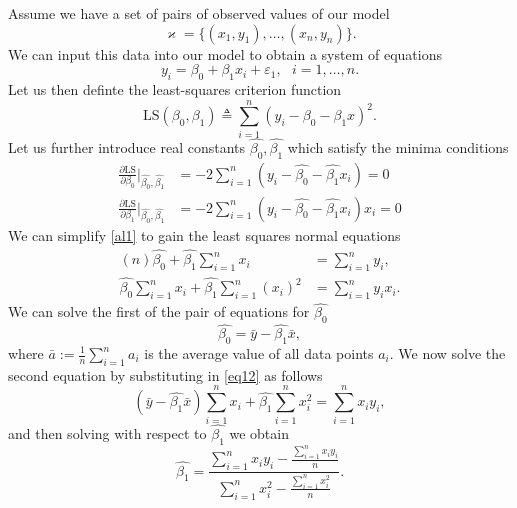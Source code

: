 \documentclass[10pt,a4paper]{article}
\numberwithin{equation}{section}
\theoremstyle{plain}
\theoremstyle{own}
\begin{document}
Assume we have a set of pairs of observed values of our model 
\begin{equation}
\varkappa = \{ (x_1, y_1), \ldots, (x_n, y_n) \}.
\end{equation}
We can input this data into our model to obtain a system of equations
\begin{equation}
y_i = \beta_0 + \beta_1x_i + \varepsilon_1,~~~ i = 1, \ldots, n.
\end{equation}
Let us then definte the least-squares criterion function
\begin{equation}
\mathrm{LS}(\beta_0, \beta_1) \triangleq \sum_{i=1}^n (y_i - \beta_0 - \beta_1x)^2.
\end{equation}
Let us further introduce real constants $\hat{\beta_0}, \hat{\beta_1}$ which satisfy the minima conditions
\begin{align} \label{al1} \nonumber
\frac{\partial \mathrm{LS}}{\partial \beta_0} \Big|_{\hat{\beta_0}, \hat{\beta_1}} & = -2 \sum_{i=1}^n (y_i - \hat{\beta_0} - \hat{\beta_1}x_i) = 0 \\
\frac{\partial \mathrm{LS}}{\partial \beta_1} \Big|_{\hat{\beta_0}, \hat{\beta_1}} & = -2 \sum_{i=1}^n (y_i - \hat{\beta_0} - \hat{\beta_1}x_i)x_i = 0
\end{align}
We can simplify \cref{al1} to gain the least squares normal equations
\begin{align}
\nonumber
(n) \hat{\beta_0} + \hat{\beta_1} \sum_{i=1}^n x_i & = \sum_{i=1}^n y_i, \\
 \hat{\beta_0} \sum_{i=1}^n x_i + \hat{\beta_1} \sum_{i=1}^n (x_i)^2 & = \sum_{i=1}^n y_i x_i.
\end{align}
We can solve the first of the pair of equations for $\hat{\beta_0}$
\begin{equation} \label{eq12}
\hat{\beta_0} = \bar{y} - \hat{\beta_1} \bar{x},
\end{equation}
where $\bar{a} := \frac{1}{n} \sum_{i = 1}^n a_i$ is the average value of all data points $a_i$. We now solve the second equation by substituting in \cref{eq12} as follows
\begin{equation} \label{eq13}
(\bar{y} - \hat{\beta_1} \bar{x}) \sum_{i=1}^n x_i + \hat{\beta_1} \sum_{i=1}^n x_i^2 = \sum_{i=1}^n x_i y_i,
\end{equation}
and then solving with respect to $\hat{\beta_1}$ we obtain
\begin{equation} \label{eq14}
\hat{\beta_1} = \frac{\sum_{i=1}^n x_i y_i - \frac{\sum_{i = 1}^n x_i y_i}{n}}{\sum_{i=1}^n x_i^2 - \frac{\sum_{i=1}^n x_i^2}{n}}.
\end{equation}
\end{document}
